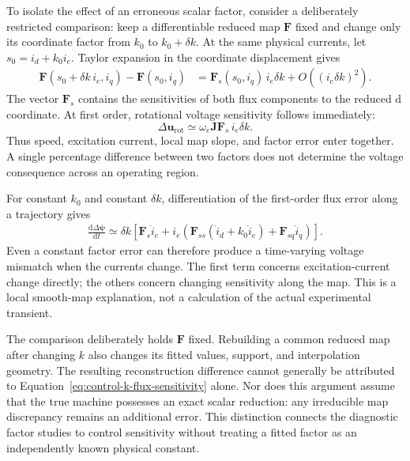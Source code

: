 To isolate the effect of an erroneous scalar factor, consider a deliberately restricted comparison: keep a differentiable reduced map $\bm F$ fixed and change only its coordinate factor from $k_0$ to $k_0+\delta k$. At the same physical currents, let $s_0=i_d+k_0i_e$. Taylor expansion in the coordinate displacement gives
\begin{align}
 \bm F(s_0+\delta k\,i_e,i_q)-\bm F(s_0,i_q)
 &=\bm F_s(s_0,i_q)\,i_e\delta k
       +O((i_e\delta k)^2).
 \label{eq:control-k-flux-sensitivity}
\end{align}
The vector $\bm F_s$ contains the sensitivities of both flux components to the reduced d coordinate. At first order, rotational voltage sensitivity follows immediately:
\begin{equation}
 \Delta\bm u_{\mathrm{rot}}
 \simeq\omega_e\bm J\bm F_s\,i_e\delta k.
\end{equation}
Thus speed, excitation current, local map slope, and factor error enter together. A single percentage difference between two factors does not determine the voltage consequence across an operating region.

For constant $k_0$ and constant $\delta k$, differentiation of the first-order flux error along a trajectory gives
\begin{align}
 \frac{\mathrm d\Delta\bm\psi}{\mathrm dt}
 \simeq\delta k\left[
 \bm F_s\dot i_e+
 i_e\left(\bm F_{ss}(\dot i_d+k_0\dot i_e)
                    +\bm F_{sq}\dot i_q\right)\right].
 \label{eq:control-k-transient-sensitivity}
\end{align}
Even a constant factor error can therefore produce a time-varying voltage mismatch when the currents change. The first term concerns excitation-current change directly; the others concern changing sensitivity along the map. This is a local smooth-map explanation, not a calculation of the actual experimental transient.

The comparison deliberately holds $\bm F$ fixed. Rebuilding a common reduced map after changing $k$ also changes its fitted values, support, and interpolation geometry. The resulting reconstruction difference cannot generally be attributed to Equation~\eqref{eq:control-k-flux-sensitivity} alone. Nor does this argument assume that the true machine possesses an exact scalar reduction: any irreducible map discrepancy remains an additional error. This distinction connects the diagnostic factor studies to control sensitivity without treating a fitted factor as an independently known physical constant.

